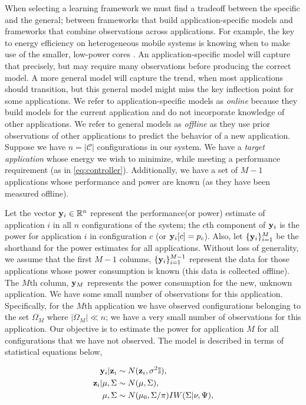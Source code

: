 When selecting a learning framework we must find a tradeoff between
the specific and the general; \ie between frameworks that build
application-specific models and frameworks that combine observations
across applications.  For example, the key to energy efficiency on
heterogeneous mobile systems is knowing when to make use of the
smaller, low-power cores \cite{}.  An application-specific model will
capture that precisely, but may require many observations before
producing the correct model.  A more general model will capture the
trend, \eg when most applications should transition, but this general
model might miss the key inflection point for some applications.  We
refer to application-specific models as \emph{online} because they
build models for the current application and do not incorporate
knowledge of other applications.  We refer to general models as
\emph{offline} as they use prior observations of other applications to
predict the behavior of a new application.
Suppose we have $n = |\mathcal{C}|$ configurations in our system.  We
have a \textit{target application} whose energy we wish to minimize,
while meeting a performance requirement (as in \eqref{eq:controller}).
Additionally, we have a set of $M-1$ applications whose performance
and power are known (as they have been measured offline).

Let the vector $\mathbf{y}_i \in \mathbb{R}^{n}$ represent the performance(or power) estimate of application $i$ in all $n$ configurations of the
system; \ie the $c$th component of $\mathbf{y}_i$ is the power for application
$i$ in configuration $c$ (or $\mathbf{y}_i[c] = p_c$).  Also, let $\{\mathbf{y}_i\}_{i =1}^M$ be the shorthand for the power estimates for all applications.  Without loss of generality, we assume that the first $M-1$
columns, \ie $\{\mathbf{y}_i\}_{i =1}^{M-1}$ represent the data for those
applications whose power consumption is known (this data is collected
offline).  The $M$th column, $\mathbf{y}_M$ represents the power consumption
for the new, unknown application.  We have some small number of
observations for this application.  Specifically, for the $M$th application we have observed
configurations belonging to the set $\Omega_M$ where $|\Omega_M| \ll
n$; \ie we have a very small number of observations for this
application.  Our objective is to estimate the power for application
$M$ for all configurations that we have not observed.
The model is described in terms of statistical equations below,

\begin{equation}
\begin{aligned}
\mathbf{y}_i \vert \mathbf{z}_i  &\sim N( \mathbf{z}_i, \sigma^2 \mathbb{I}),\\
\mathbf{z}_i \vert \mu,\Sigma &\sim N(\mu, \Sigma),\\
\mu, \Sigma &\sim N(\mu_0,\Sigma / \pi)IW(\Sigma | \nu, \Psi),
\end{aligned}
\label{eq:HBN}
\end{equation}

